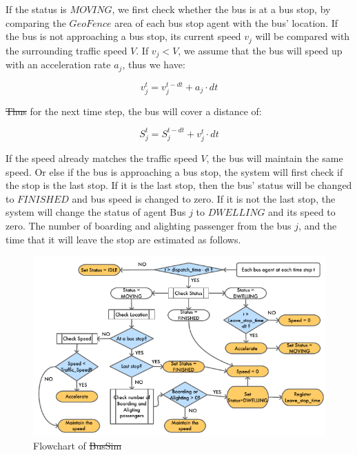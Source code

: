 \documentclass[11pt]{article}
\providecommand{\DIFaddtex}[1]{{\protect\color{blue}\uwave{#1}}} %
\providecommand{\DIFdeltex}[1]{{\protect\color{red}\sout{#1}}}                      %
\providecommand{\DIFaddbegin}{} %
\providecommand{\DIFaddend}{} %
\providecommand{\DIFdelbegin}{} %
\providecommand{\DIFdelend}{} %
\providecommand{\DIFaddFL}[1]{\DIFadd{#1}} %
\providecommand{\DIFdelFL}[1]{\DIFdel{#1}} %
\providecommand{\DIFaddbeginFL}{} %
\providecommand{\DIFaddendFL}{} %
\providecommand{\DIFdelbeginFL}{} %
\providecommand{\DIFdelendFL}{} %
\providecommand{\DIFadd}[1]{\texorpdfstring{\DIFaddtex{#1}}{#1}} %
\providecommand{\DIFdel}[1]{\texorpdfstring{\DIFdeltex{#1}}{}} %
\newcommand{\DIFscaledelfig}{0.5}
\newlength{\DIFdelgraphicswidth} %
\newlength{\DIFdelgraphicsheight} %
\newcommand{\DIFaddincludegraphics}[2][]{{\color{blue}\fbox{\DIFOincludegraphics[#1]{#2}}}} %
\newcommand{\DIFdelincludegraphics}[2][]{%
\sbox{\DIFdelgraphicsbox}{\DIFOincludegraphics[#1]{#2}}%
\settoboxwidth{\DIFdelgraphicswidth}{\DIFdelgraphicsbox} %
\settoboxtotalheight{\DIFdelgraphicsheight}{\DIFdelgraphicsbox} %
\scalebox{\DIFscaledelfig}{%
\parbox[b]{\DIFdelgraphicswidth}{\usebox{\DIFdelgraphicsbox}\\[-\baselineskip] \rule{\DIFdelgraphicswidth}{0em}}\llap{\resizebox{\DIFdelgraphicswidth}{\DIFdelgraphicsheight}{%
\setlength{\unitlength}{\DIFdelgraphicswidth}%
\begin{picture}(1,1)%
\thicklines\linethickness{2pt} %
{\color[rgb]{1,0,0}\put(0,0){\framebox(1,1){}}}%
{\color[rgb]{1,0,0}\put(0,0){\line( 1,1){1}}}%
{\color[rgb]{1,0,0}\put(0,1){\line(1,-1){1}}}%
\end{picture}%
}\hspace*{3pt}}} %
} %
\DeclareRobustCommand{\DIFaddbegin}{\DIFOaddbegin \let\includegraphics\DIFaddincludegraphics} %
\DeclareRobustCommand{\DIFaddend}{\DIFOaddend \let\includegraphics\DIFOincludegraphics} %
\DeclareRobustCommand{\DIFdelbegin}{\DIFOdelbegin \let\includegraphics\DIFdelincludegraphics} %
\DeclareRobustCommand{\DIFdelend}{\DIFOaddend \let\includegraphics\DIFOincludegraphics} %
\DeclareRobustCommand{\DIFaddbeginFL}{\DIFOaddbeginFL \let\includegraphics\DIFaddincludegraphics} %
\DeclareRobustCommand{\DIFaddendFL}{\DIFOaddendFL \let\includegraphics\DIFOincludegraphics} %
\DeclareRobustCommand{\DIFdelbeginFL}{\DIFOdelbeginFL \let\includegraphics\DIFdelincludegraphics} %
\DeclareRobustCommand{\DIFdelendFL}{\DIFOaddendFL \let\includegraphics\DIFOincludegraphics} %
\begin{document}
If the status is $MOVING$, we first check whether the bus is at a bus stop, by comparing the $GeoFence$ area of each bus stop agent with the bus' location. If the bus is not approaching a bus stop, its current speed $v_j$ will be compared with the surrounding traffic speed $V$. If $v_j<V$, we assume that the bus will speed up with an acceleration rate $a_j$, thus we have: 
\DIFdelbegin %

\DIFdelend \begin{equation}
    v_j^{t} = v_j^{t-dt} + a_j \cdot dt
\end{equation}

\DIFdelbegin \DIFdel{Thus }\DIFdelend \DIFaddbegin \DIFadd{Therefore }\DIFaddend for the next time step, the bus will cover a distance of: 
\DIFdelbegin %

\DIFdelend \begin{equation}
    S_j^t = S_j^{t-dt} + v_j^t \cdot dt
\end{equation}

If the speed already matches the traffic speed $V$, the bus will maintain the same speed. Or else if the bus is approaching a bus stop, the system will first check if the stop is the last stop. If it is the last stop, then the bus' status will be changed to $FINISHED$ and bus speed is changed to zero. If it is not the last stop, the system will change the status of agent Bus $j$ to $DWELLING$ and its speed to zero. The number of boarding and alighting passenger from the bus $j$, and the time that it will leave the stop are estimated as follows.  

\DIFdelbegin %
\DIFdelendFL \DIFaddbeginFL \begin{figure}[ht]
    \DIFaddendFL \centering
    \includegraphics{Figures/bussim_flowchart6.pdf}
    \caption{Flowchart of \DIFdelbeginFL \DIFdelFL{BusSim}\DIFdelendFL \DIFaddbeginFL \DIFaddFL{BusSim-truth.}\DIFaddendFL }
    \label{fig:BusSim_flowchart}
\end{figure}
\end{document}
